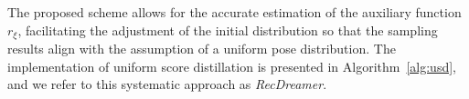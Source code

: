 The proposed scheme allows for the accurate estimation of the auxiliary function $r_\xi$, facilitating the adjustment of the initial distribution so that the sampling results align with the assumption of a uniform pose distribution. The implementation of uniform score distillation is presented in Algorithm~\ref{alg:usd}, and we refer to this systematic approach as \textit{RecDreamer}.












